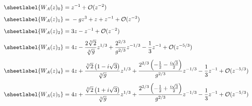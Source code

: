 \begin{sheetasymptotics}
    \begin{align*}
        \sheetlabel{W_A(z)_{0}} & ={}z^{-1}+\mathcal O(z^{-2}) \\[4pt]
        \sheetlabel{W_A(z)_{1}} & ={}-gz^{3}+z+z^{-1}+\mathcal O(z^{-2}) \\[4pt]
        \sheetlabel{W_A(z)_{2}} & ={}3z-z^{-1}+\mathcal O(z^{-2}) \\[4pt]
        \sheetlabel{W_A(z)_{3}} & ={}4z-\frac{2 \sqrt[3]{2}}{\sqrt[3]{g}}z^{1/3}+\frac{2^{2/3}}{g^{2/3}}z^{-1/3}-\frac{1}{3}z^{-1}+\mathcal O(z^{-5/3}) \\[4pt]
        \sheetlabel{W_A(z)_{4}} & ={}4z+\frac{\sqrt[3]{2} \left(1 - i \sqrt{3}\right)}{\sqrt[3]{g}}z^{1/3}+\frac{2^{2/3} \left(- \frac{1}{2} - \frac{i \sqrt{3}}{2}\right)}{g^{2/3}}z^{-1/3}-\frac{1}{3}z^{-1}+\mathcal O(z^{-5/3}) \\[4pt]
        \sheetlabel{W_A(z)_{5}} & ={}4z+\frac{\sqrt[3]{2} \left(1 + i \sqrt{3}\right)}{\sqrt[3]{g}}z^{1/3}+\frac{2^{2/3} \left(- \frac{1}{2} + \frac{i \sqrt{3}}{2}\right)}{g^{2/3}}z^{-1/3}-\frac{1}{3}z^{-1}+\mathcal O(z^{-5/3})
    \end{align*}
\end{sheetasymptotics}
